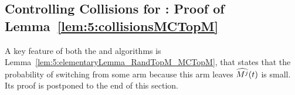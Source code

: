 %
%
%



\subsection{Controlling Collisions for \MCTopM: Proof of Lemma~\ref{lem:5:collisionsMCTopM}}
\label{proof:5:collisionsMCTopM}

A key feature of both the \RandTopM{} and \MCTopM{} algorithms is Lemma~\ref{lem:5:elementaryLemma_RandTopM_MCTopM}, that states that the probability of switching from some arm because this arm leaves $\widehat{M^j}(t)$ is small. Its proof is postponed to the end of this section.


